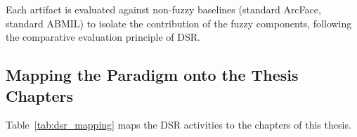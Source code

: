 Each artifact is evaluated against non-fuzzy baselines (standard ArcFace, standard ABMIL) to isolate the contribution of the fuzzy components, following the comparative evaluation principle of DSR.

\subsection{Mapping the Paradigm onto the Thesis Chapters}
\label{sec:bg:dsr:application}

Table~\ref{tab:dsr_mapping} maps the DSR activities to the chapters of this thesis.



